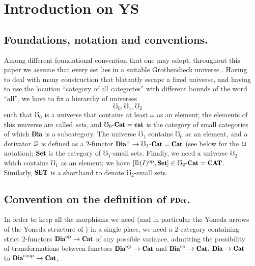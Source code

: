 \section{Introduction on YS}

\subsection{Foundations, notation and conventions.}
Among different foundational convention that one may adopt, throughout this paper we assume that every set lies in a suitable Grothendieck universe \cite{artin1972sga}. Having to deal with many construction that blatantly escape a fixed universe, and having to use the locution ``category of all categories'' with different bounds of the word ``all'', we have to fix a hierarchy of universes
\[
\mho_0, \mho_1, \mho_2
\]
such that $\mho_0$ is a universe that contains at least $\omega$ as an element; the elements of this universe are called \emph{sets}, and $\mho_0\text{-}\Cat = \ct$ is the category of small categories of which $\Dia$ is a subcategory. The universe $\mho_1$ contains $\mho_0$ as an element, and a derivator $\mathbb{D}$ is defined as a 2-functor $\Dia^\smlerp\to \mho_1\text{-}\Cat=\Cat$ (see below for the $\smlerp$ notation); $\Set$ is the category of $\mho_1$-small sets. Finally, we need a universe $\mho_2$ which contains $\mho_1$ as an element; we have $[\D(I)^\opp, \Set]\in\mho_2\text{-}\Cat = \CAT$. Similarly, $\SET$ is a shorthand to denote $\mho_2$-small sets.
\subsection{Convention on the definition of $\PDer$.}
\label{derdef}
In order to keep all the morphisms we need (and in particular the Yoneda arrows of the Yoneda structure of \adef{}) in a single place, we need a 2-category containing strict 2-functors $\Dia^\opp \to \Cat$ of any possible variance, admitting the possibility of transformations between functors $\Dia^\opp \to \Cat$ and $\Dia^\co \to \Cat$, $\Dia \to \Cat$ to $\Dia^\coop \to \Cat$, \etc

